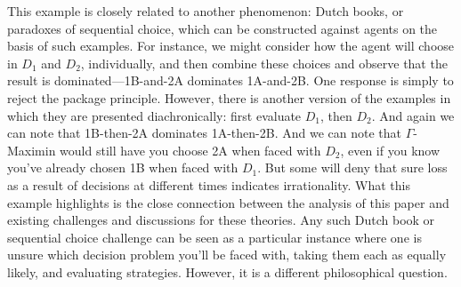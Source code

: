 \documentclass[a4paper]{article}
\newcommand{\todoinfo}[2][]{\todo[backgroundcolor=orange!80,bordercolor=black,linecolor=gray!80, #1,inline,caption={}]{#2}}
\renewcommand{\color}[1]{}
\newenvironment{CCM rewritten}
{\begingroup\color{blue}} %
{\endgroup}              %
\begin{document}
{\color{orange}
	This example is closely related to another phenomenon: Dutch books, or paradoxes of sequential choice, which can be constructed against agents on the basis of such examples. \todoinfo{REFS!!!!}
	For instance, we might consider how the agent will choose in $D_1$ and $D_2$, individually, and then combine these choices and observe that the result is dominated---1B-and-2A dominates 1A-and-2B. One response is simply to reject the package principle. However, there is another version of the examples in which they are presented diachronically: first evaluate $D_1$, then $D_2$. And again we can note that 1B-then-2A dominates 1A-then-2B. And we can note that $\Gamma$-Maximin would still have you choose 2A when faced with $D_2$, even if you know you've already chosen 1B when faced with $D_1$. But some will deny that sure loss as a result of decisions at different times indicates irrationality.
	{\color{blue}
		What this example highlights is the close connection between the analysis of this paper and existing challenges and discussions for these theories. Any such Dutch book or sequential choice challenge can be seen as a particular instance where one is unsure which decision problem you'll be faced with, taking them each as equally likely, and evaluating strategies. However, it is a different philosophical question. 
	}
}
\end{document}
